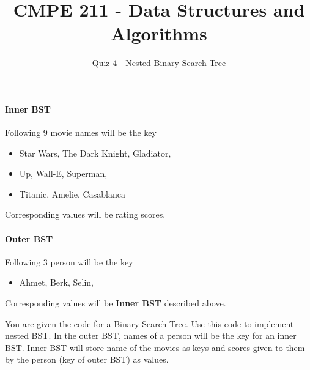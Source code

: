 \documentclass{article}
\begin{document}
\author{Quiz 4 - Nested Binary Search Tree}
\title{CMPE 211 - Data Structures and Algorithms}




\date{}
\maketitle
\setcounter{secnumdepth}{0}

\paragraph{Inner BST}
Following 9 movie names will be the key
\begin{itemize}
\item Star Wars, The Dark Knight, Gladiator,
\item Up, Wall-E, Superman,
\item Titanic, Amelie, Casablanca
\end{itemize}
Corresponding values will be rating scores.



\paragraph{Outer BST}
Following 3 person will be the key
\begin{itemize}
\item Ahmet, Berk, Selin,
\end{itemize}
Corresponding values will be \textbf{Inner BST} described above.


\hspace{2cm}


You are given the code for a Binary Search Tree. Use this code to implement nested BST. In the outer BST, names of a person will be the key for an inner BST. Inner BST will store name of the movies as keys and scores given to them by the person (key of outer BST) as values.
\end{document}
